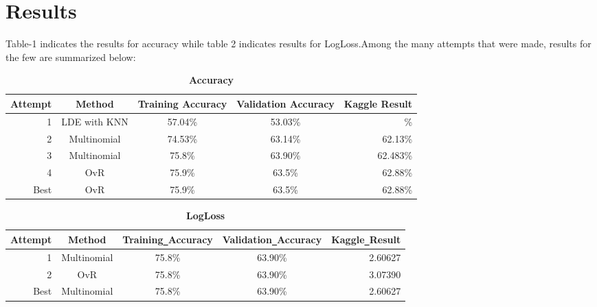 \documentclass[journal]{IEEEtran}
\begin{document}
\section{Results}
Table-1 indicates the results for accuracy while table 2 indicates results for LogLoss.Among the many attempts that were made, results for the few are summarized below: \par
\begin{table}[!htb]
	\captionsetup{size=footnotesize}
	\caption{\textbf{Accuracy}} \label{tab:freq}
	\setlength\tabcolsep{0pt} %
	\footnotesize\centering
	
	\smallskip 
	\begin{tabular*}{\columnwidth}{@{\extracolsep{\fill}}rcccr}
		\toprule
		Attempt  & Method & Training Accuracy & Validation Accuracy & Kaggle Result \\
		\midrule
		1   & LDE with KNN & 57.04\%   & 53.03\%    & \% \\
		2   & Multinomial   & 74.53\%    & 63.14\%     & 62.13\% \\
		3   & Multinomial   & 75.8\%     & 63.90\%     & 62.483\% \\
		4   & OvR   & 75.9\%     & 63.5\%     & 62.88\% \\
		\midrule
		Best & OvR & 75.9\%     & 63.5\%     & 62.88\% \\
		\bottomrule
	\end{tabular*}
\end{table}

\begin{table}[!htb]
	\captionsetup{size=footnotesize}
	\caption{\textbf{LogLoss}} \label{tab:freq}
	\setlength\tabcolsep{0pt} %
	\footnotesize\centering
	
	\smallskip 
	\begin{tabular*}{\columnwidth}{@{\extracolsep{\fill}}rcccr}
		\toprule
		Attempt  & Method & Training\verb!_!Accuracy & Validation\verb!_!Accuracy & Kaggle\verb!_!Result \\
		\midrule
		1   & Multinomial   & 75.8\%    & 63.90\%   & 2.60627 \\
		2   & OvR   & 75.8\%     & 63.90\%     & 3.07390 \\
		\midrule
		Best   & Multinomial   & 75.8\%    & 63.90\%   & 2.60627 \\
		\bottomrule
	\end{tabular*}
\end{table}
\end{document}
